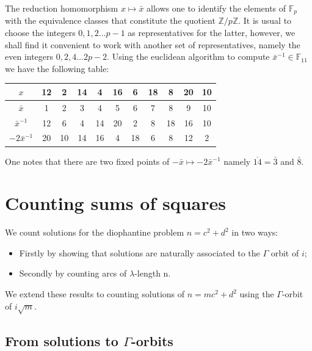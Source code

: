 \documentclass[12pt,a4paper]{amsart}
\def\fp{\mathbb{F}_p}
\begin{document}
The reduction homomorphism $x\mapsto \bar{x}$
allows one to identify the elements of $\fp$
with the equivalence classes that constitute
 the quotient $\mathbb{Z}/p \mathbb{Z} $.
It is usual  
to choose the integers $0,1, 2\ldots p-1$ as representatives for the
latter, 
however, we shall find it convenient to work with
another set of representatives, namely the even integers 
$0, 2, 4 \ldots 2p -2$.
Using the euclidean algorithm to compute $\bar{x}^{-1} \in \mathbb{F}_{11}$
we have the following table:
\vspace{.1in}
\begin{center}
	
\begin{tabular}{|c|c|c|c|c|c|c|c|c|c|c|}
	\hline
	${x}$ & 12 & 2 & 14 & 4 & 16 & 6 & 18 & 8 & 20 & 10 \\
	\hline
	$\bar{x}$ & 1 & 2 & 3 & 4 & 5 & 6 & 7 & 8 & 9 & 10 \\

	\hline
	$\bar{x}^{-1}$& 12 & 6 & 4 & 14 & 20 & 2 & 8 & 18 & 16 & 10 \\
	\hline
$-2\bar{x}^{-1}$& 20 & 10 & 14 & 16 & 4 & 18 & 6 & 8 & 12 & 2 \\
	\hline
\end{tabular}
\end{center}
\vspace{.1in}
One notes that there are two fixed points of $-\bar{x} \mapsto
-2\bar{x}^{-1}$ namely $\overline{14}=\bar{3}$ and $\bar{8}$.


\section{Counting sums of squares}

We count solutions for the diophantine problem $n = c^2 + d^2$ in two ways:
\begin{itemize}
	\item Firstly by showing that solutions are
		naturally associated to the  $\Gamma$
		orbit of $i$;
	\item Secondly by counting arcs of $\lambda$-length n.
\end{itemize}

We extend these results to counting solutions of $n = mc^2 + d^2$
using the $\Gamma$-orbit of $i\sqrt{m}$.


\subsection{From solutions to $\Gamma$-orbits}
\end{document}
